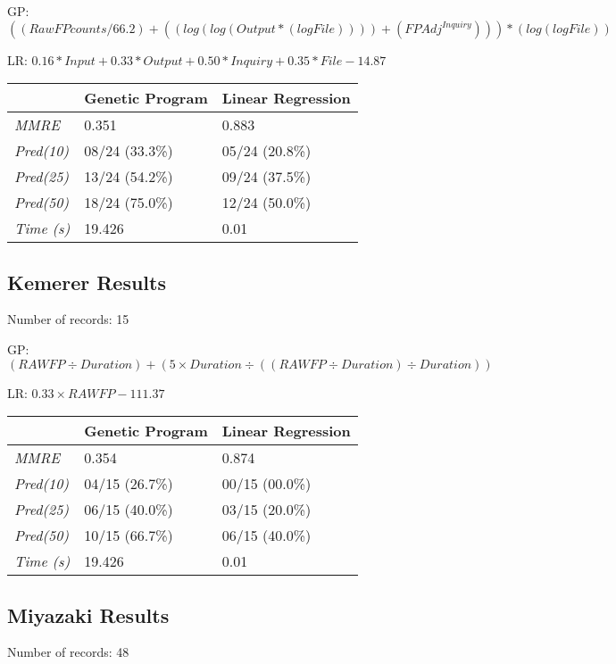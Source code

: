 \documentclass[11pt, a4paper]{article}
\begin{document}
GP:
\(((RawFPcounts / 66.2) + ((log (log (Output * (log File)))) +
(FPAdj ^ {Inquiry}))) * (log (log File))\)

LR:
\(0.16 * Input + 0.33 * Output + 0.50 * Inquiry + 0.35 * File - 14.87\)

\begin{tabularx}{\textwidth}{| l | X | X |}
\hline
 & \textbf{Genetic Program} & \textbf{Linear Regression} \\
\hline
\emph{MMRE} & 0.351 & 0.883 \\
\hline
\emph{Pred(10)} & 08/24 (33.3\%) & 05/24 (20.8\%) \\
\emph{Pred(25)} & 13/24 (54.2\%) & 09/24 (37.5\%) \\
\emph{Pred(50)} & 18/24 (75.0\%) & 12/24 (50.0\%) \\
\hline
\emph{Time (s)} & 19.426 & 0.01 \\
\hline
\end{tabularx}

\subsection{Kemerer Results} %
\label{sub:kemerer_results}
Number of records: 15

GP: \((RAWFP \div Duration) + (5 \times Duration \div ((RAWFP \div Duration)
\div Duration))\)

LR: \(0.33 \times RAWFP - 111.37\)

\begin{tabularx}{\textwidth}{| l | X | X |}
\hline
 & \textbf{Genetic Program} & \textbf{Linear Regression} \\
\hline
\emph{MMRE} & 0.354 & 0.874 \\
\hline
\emph{Pred(10)} & 04/15 (26.7\%) & 00/15 (00.0\%) \\
\emph{Pred(25)} & 06/15 (40.0\%) & 03/15 (20.0\%) \\
\emph{Pred(50)} & 10/15 (66.7\%) & 06/15 (40.0\%) \\
\hline
\emph{Time (s)} & 19.426 & 0.01 \\
\hline
\end{tabularx}

\subsection{Miyazaki Results} %
\label{sub:miyazaki_results}
Number of records: 48
\end{document}
